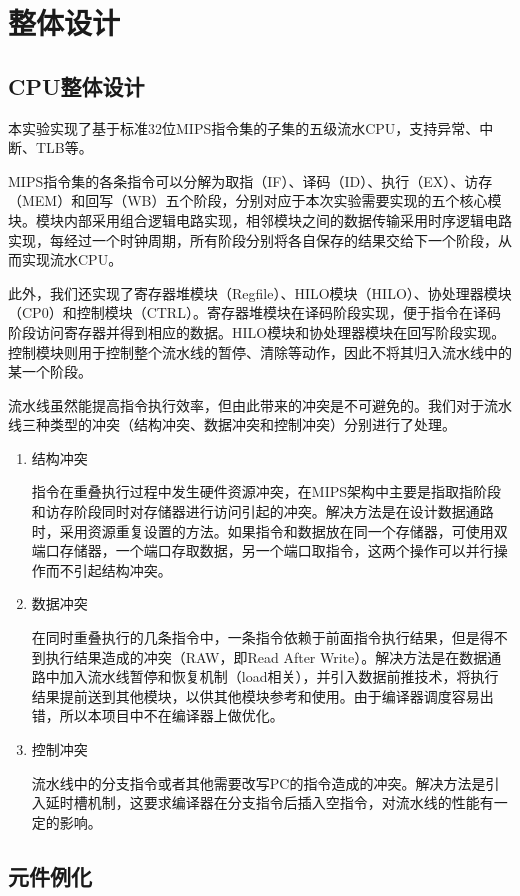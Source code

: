 \section{整体设计}
\subsection{CPU整体设计}
本实验实现了基于标准32位MIPS指令集的子集的五级流水CPU，支持异常、中断、TLB等。

MIPS指令集的各条指令可以分解为取指（IF）、译码（ID）、执行（EX）、访存（MEM）和回写（WB）五个阶段，分别对应于本次实验需要实现的五个核心模块。模块内部采用组合逻辑电路实现，相邻模块之间的数据传输采用时序逻辑电路实现，每经过一个时钟周期，所有阶段分别将各自保存的结果交给下一个阶段，从而实现流水CPU。

此外，我们还实现了寄存器堆模块（Regfile）、HILO模块（HILO）、协处理器模块（CP0）和控制模块（CTRL）。寄存器堆模块在译码阶段实现，便于指令在译码阶段访问寄存器并得到相应的数据。HILO模块和协处理器模块在回写阶段实现。控制模块则用于控制整个流水线的暂停、清除等动作，因此不将其归入流水线中的某一个阶段。

流水线虽然能提高指令执行效率，但由此带来的冲突是不可避免的。我们对于流水线三种类型的冲突（结构冲突、数据冲突和控制冲突）分别进行了处理。
\begin{enumerate}
	\item 结构冲突
	
	指令在重叠执行过程中发生硬件资源冲突，在MIPS架构中主要是指取指阶段和访存阶段同时对存储器进行访问引起的冲突。解决方法是在设计数据通路时，采用资源重复设置的方法。如果指令和数据放在同一个存储器，可使用双端口存储器，一个端口存取数据，另一个端口取指令，这两个操作可以并行操作而不引起结构冲突。
	
	\item 数据冲突
	
	在同时重叠执行的几条指令中，一条指令依赖于前面指令执行结果，但是得不到执行结果造成的冲突（RAW，即Read After Write）。解决方法是在数据通路中加入流水线暂停和恢复机制（load相关），并引入数据前推技术，将执行结果提前送到其他模块，以供其他模块参考和使用。由于编译器调度容易出错，所以本项目中不在编译器上做优化。
	
	\item 控制冲突
	
	流水线中的分支指令或者其他需要改写PC的指令造成的冲突。解决方法是引入延时槽机制，这要求编译器在分支指令后插入空指令，对流水线的性能有一定的影响。
	
\end{enumerate}
\subsection{元件例化}
